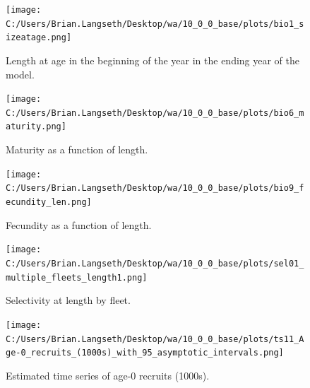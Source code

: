 \documentclass[11pt,
  english,
  a4paper,
]{article}
\begin{document}
\begin{figure}
\centering
\texttt{[image: C:/Users/Brian.Langseth/Desktop/wa/10\_0\_0\_base/plots/bio1\_sizeatage.png]}
\caption{Length at age in the beginning of the year in the ending year of the model.\label{fig:len-age-ss}}
\end{figure}

\tagmcend\tagstructend


\begin{figure}
\centering
\texttt{[image: C:/Users/Brian.Langseth/Desktop/wa/10\_0\_0\_base/plots/bio6\_maturity.png]}
\caption{Maturity as a function of length.\label{fig:maturity}}
\end{figure}

\tagmcend\tagstructend


\begin{figure}
\centering
\texttt{[image: C:/Users/Brian.Langseth/Desktop/wa/10\_0\_0\_base/plots/bio9\_fecundity\_len.png]}
\caption{Fecundity as a function of length.\label{fig:fecundity}}
\end{figure}

\tagmcend\tagstructend


\begin{figure}
\centering
\texttt{[image: C:/Users/Brian.Langseth/Desktop/wa/10\_0\_0\_base/plots/sel01\_multiple\_fleets\_length1.png]}
\caption{Selectivity at length by fleet.\label{fig:selex}}
\end{figure}

\tagmcend\tagstructend


\begin{figure}
\centering
\texttt{[image: C:/Users/Brian.Langseth/Desktop/wa/10\_0\_0\_base/plots/ts11\_Age-0\_recruits\_(1000s)\_with\_95\_asymptotic\_intervals.png]}
\caption{Estimated time series of age-0 recruits (1000s).\label{fig:recruits}}
\end{figure}

\tagmcend\tagstructend

\end{document}
